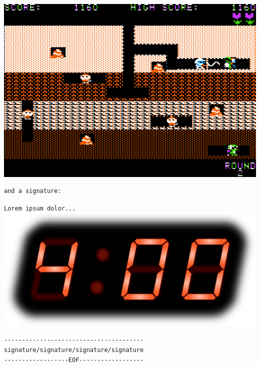 \documentclass{article}
\begin{document}
\centerline{\includegraphics[width=.9\textwidth]{level2}}

\begin{verbatim}
and a signature:
\end{verbatim}


\noindent
{\tt Lorem ipsum dolor...} \hspace*{\fill} \includegraphics[trim=0 400 0 0,width=.4\textwidth]{4am-clock}

\vspace*{\fill}

\begin{verbatim}
---------------------------------------
signature/signature/signature/signature
------------------EOF------------------
\end{verbatim}
\end{document}
